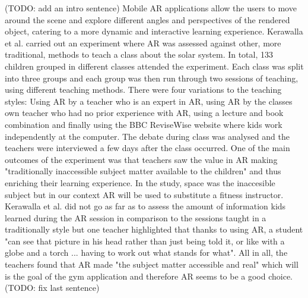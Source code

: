 \documentclass{l4proj}
\begin{document}
(TODO: add an intro sentence)
Mobile AR applications allow the users to move around the scene and explore different angles and perspectives of the rendered object, catering to a more dynamic and interactive learning experience\cite{fitzgerald_augmented_2013}\cite{dede_immersive_2009}. Kerawalla et al. carried out an experiment where AR was assessed against other, more traditional, methods to teach a class about the solar system\cite{kerawalla_making_2006}. In total, 133 children grouped in different classes attended the experiment. Each class was split into three groups and each group was then run through two sessions of teaching, using different teaching methods. There were four variations to the teaching styles: Using AR by a teacher who is an expert in AR, using AR by the classes own teacher who had no prior experience with AR, using a lecture and book combination and finally using the BBC ReviseWise website where kids work independently at the computer. The debate during class was analysed and the teachers were interviewed a few days after the class occurred. One of the main outcomes of the experiment was that teachers saw the value in AR making "traditionally inaccessible subject matter available to the children"\cite{kerawalla_making_2006} and thus enriching their learning experience. In the study, space was the inaccesible subject but in our context AR will be used to substitute a fitness instructor. Kerawalla et al. did not go as far as to assess the amount of information kids learned during the AR session in comparison to the sessions taught in a traditionally style but one teacher highlighted that thanks to using AR, a student "can see that picture in his head rather than just being told it, or like with a globe and a torch ... having to work out what stands for what"\cite{kerawalla_making_2006}. All in all, the teachers found that AR made "the  subject  matter  accessible  and real" which will is the goal of the gym application and therefore AR seems to be a good choice. 
(TODO: fix last sentence)
\end{document}
